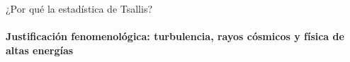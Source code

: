 \documentclass{beamer}
\begin{document}
\begin{frame}{¿Por qué la estadística de Tsallis?}
  \framesubtitle{Justificación fenomenológica: turbulencia, rayos cósmicos y física de altas energías}

  \begin{columns}





\end{columns}
\end{frame}
\end{document}
